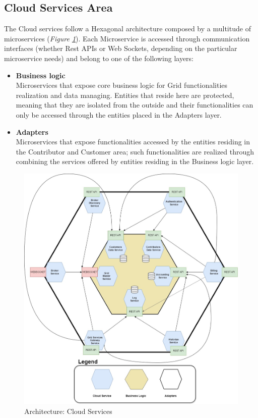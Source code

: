 \subsection{Cloud Services Area}\label{cloud_services_area}
The Cloud services follow a Hexagonal architecture composed by a multitude of microservices (\textit{Figure \ref{fig:architecture_cloud_services}}). Each Microservice is accessed through communication interfaces (whether Rest APIs or Web Sockets, depending on the particular microservice needs) and belong to one of the following layers:
\begin{itemize}
    \item \textbf{Business logic}\\
    Microservices that expose core business logic for Grid functionalities realization and data managing. Entities that  reside here are protected, meaning that they are isolated from the outside and their functionalities can only be accessed through the entities placed in the Adapters layer.
    \item \textbf{Adapters}\\
    Microservices that expose functionalities accessed by the entities residing in the Contributor and Customer area; such functionalities are realized through combining the services offered by entities residing in the Business logic layer.
\end{itemize}
\begin{figure}[!ht]
    \centering
    \includegraphics[scale=0.35]{document/chapters/chapter_6/images/architecture_cloud_services.jpg}
    \caption{Architecture: Cloud Services}
    \label{fig:architecture_cloud_services}
\end{figure}

